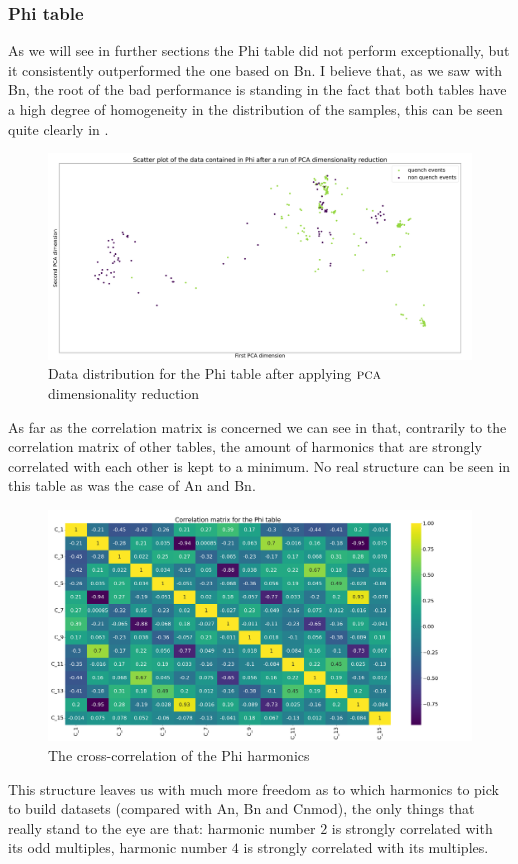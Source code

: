 \subsubsection{Phi table}
As we will see in further sections the Phi table did not perform exceptionally, but it consistently
outperformed the one based on Bn. I believe that, as we saw with Bn, the root of the bad performance
is standing in the fact that both tables have a high degree of homogeneity in the distribution of
the samples, this can be seen quite clearly in .

\begin{figure}[h!]
	\centering
	\includegraphics[width=\linewidth]{img/Phi_distribution.png}
	\caption{Data distribution for the Phi table after applying $\textsc{pca}$ dimensionality
		reduction} \label{fig:phi-dist}
\end{figure}

\medskip

As far as the correlation matrix is concerned we can see in  that, contrarily to
the correlation matrix of other tables, the amount of harmonics that are strongly correlated with
each other is kept to a minimum. No real structure can be seen in this table as was the case of An
and Bn.
\begin{figure}[h!]
	\centering
	\includegraphics[width=\linewidth]{img/Phi_corr_matrix.png}
	\caption{The cross-correlation of the Phi harmonics} \label{fig:phi-corr}
\end{figure}
This structure leaves us with much more freedom as to which harmonics to pick to build datasets
(compared with An, Bn and Cnmod), the only things that really stand to the eye are that: harmonic
number $2$ is strongly correlated with its odd multiples, harmonic number $4$ is strongly correlated
with its multiples.

